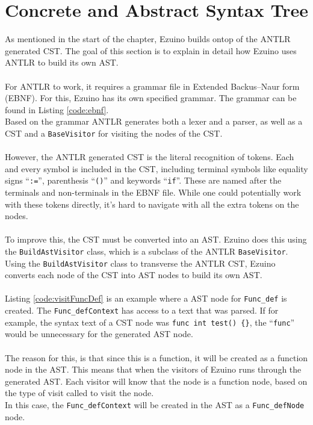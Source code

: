 \section{Concrete and Abstract Syntax Tree}
As mentioned in the start of the chapter, Ezuino builds ontop of the ANTLR generated CST. The goal of this section is to explain in detail how Ezuino uses ANTLR to build its own AST.
\\\\
For ANTLR to work, it requires a grammar file in Extended Backus–Naur form (EBNF). For this, Ezuino has its own specified grammar. The grammar can be found in Listing \ref{code:ebnf}.\\
Based on the grammar ANTLR generates both a lexer and a parser, as well as a CST and a \texttt{BaseVisitor} for visiting the nodes of the CST.
\\\\
However, the ANTLR generated CST is the literal recognition of tokens. Each and every symbol is included in the CST, including terminal symbols like equality signs “\texttt{:=}”, parenthesis “\texttt{()}” and keywords “\texttt{if}”. These are named after the terminals and non-terminals in the EBNF file. While one could potentially work with these tokens directly, it’s hard to navigate with all the extra tokens on the nodes.
\\\\
To improve this, the CST must be converted into an AST. Ezuino does this using the \texttt{BuildAstVisitor} class, which is a subclass of the ANTLR \texttt{BaseVisitor}. Using the \texttt{BuildAstVisitor} class to transverse the ANTLR CST, Ezuino converts each node of the CST into AST nodes to build its own AST.
\\\\
Listing \ref{code:visitFuncDef} is an example where a AST node for \texttt{Func\_def} is created. The \texttt{Func\_defContext} has access to a text that was parsed. If for example, the syntax text of a CST node was \texttt{func int test() \{\}}, the “\texttt{func}” would be unnecessary for the generated AST node.
\\\\
The reason for this, is that since this is a function, it will be created as a function node in the AST. This means that when the visitors of Ezuino runs through the generated AST. Each visitor will know that the node is a function node, based on the type of visit called to visit the node.\\
In this case, the \texttt{Func\_defContext} will be created in the AST as a \texttt{Func\_defNode} node.
